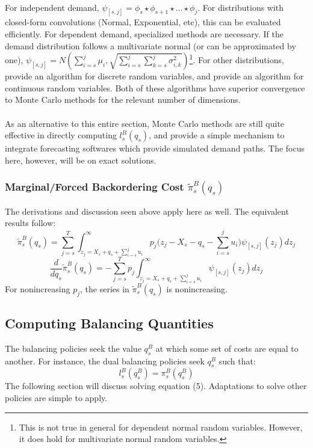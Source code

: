 \documentclass[12pt]{article}
\begin{document}
\\
For independent demand, $\psi_{[s,j]} = \phi_s \star \phi_{s+1} \star \dots \star \phi_j$.
For distributions with closed-form convolutions (Normal, Exponential, etc), this can be evaluated efficiently. For dependent demand, specialized methods are necessary. If the demand distribution follows a multivariate normal (or can be approximated by one), $\psi_{[s,j]} = N(\sum_{i=s}^j \mu_i, \sqrt{\sum_{i=s}^{j} \sum_{k=s}^j \sigma_{i,k}^2})$\footnote{This is not true in general for dependent normal random variables. However, it does hold for multivariate normal random variables.}. For other distributions, \cite{evans:2004} provide an algorithm for discrete random variables, and \cite{arbenz:2011} provide an algorithm for continuous random variables. Both of these algorithms have superior convergence to Monte Carlo methods for the relevant number of dimensions.\\
\\ 
As an alternative to this entire section, Monte Carlo methods are still quite effective in directly computing $l_s^B(q_s)$, and provide a simple mechanism to integrate forecasting softwares which provide simulated demand paths. The focus here, however, will be on exact solutions. 

\subsubsection{Marginal/Forced Backordering Cost $\tilde{\pi}_s^B(q_s)$}

The derivations and discussion seen above apply here as well. The equivalent results follow:
\begin{equation}
	\tilde{\pi}_s^B(q_s) =  \sum_{j=s}^T \int_{z_j= X_s + q_s + \sum_{i=s}^j u_i }^{\infty} p_j\bigg( z_j - X_s - q_s - \sum_{i=s}^j u_i \bigg)  \psi_{[s,j]}(z_j) dz_j
\end{equation}
\begin{equation}
	\frac{d}{d q_s} \tilde{\pi}_s^B(q_s) = - \sum_{j=s}^T p_j \int_{z_j=X_s + q_s + \sum_{i=s}^j u_i }^{\infty}  \psi_{[s,j]}(z_j) dz_j 
\end{equation}
For nonincreasing $p_j$, the series in $\tilde{\pi}_s^B(q_s)$ is nonincreasing. 

\subsection{Computing Balancing Quantities}

The balancing policies seek the value $q_s^B$ at which some set of costs are equal to another. For instance, the dual balancing policies seek $q_s^B$ such that:
\begin{equation}
	l_s^B(q_s^B) = \pi_s^B(q_s^B)
\end{equation}
The following section will discuss solving equation (5). Adaptations to solve other policies are simple to apply. 
\end{document}
